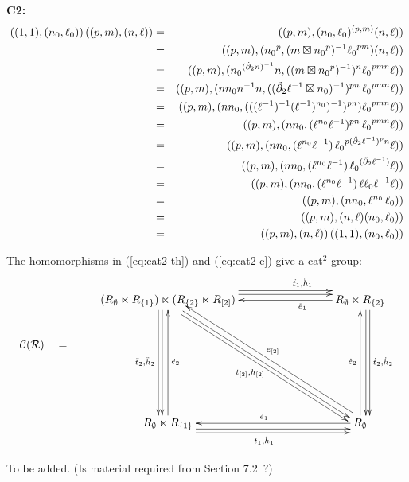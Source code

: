 \medskip\noindent
\textbf{C2:} 
\vspace{-4mm}
\begin{eqnarray*} 
((1,1),(n_0, \ell_0))\,((p,m), (n, \ell)) 
  & = & ((p, m),(n_0,\ell_0)^{(p,m)}(n,\ell))\\
  & = & ((p, m),({n_0}^p,(m \boxtimes {n_0}^p)^{-1} {\ell_0}^{pm}) (n,\ell))\\
  & = & ((p, m),({n_0}^{(\dot{\partial}_2 n)^{-1}} n,((m \boxtimes {n_0}^p)^{-1})^n
           {\ell_0}^{pmn} \ell))\\
  & = & ((p, m),(n n_0 n^{-1} n,((\ddot{\partial}_2\ell^{-1} \boxtimes n_0)^{-1})^{pn}\,
           {\ell_0}^{pmn} \ell))\\
  & = & ((p, m),(n n_0, (((\ell^{-1})^{-1}(\ell^{-1})^{n_0})^{-1})^{pn})
           {\ell_0}^{pmn} \ell))\\
  & = & ((p, m),(n n_0,(\ell^{n_0} \ell^{-1})^{pn}\,{\ell_0}^{pmn} \ell))\\
  & = & ((p, m),(n n_0,(\ell^{n_0} \ell^{-1})\,
           {\ell_0}^{p(\ddot{\partial}_2 \ell^{-1})^p n} \ell))\\
  & = & ((p, m),(n n_0,(\ell^{n_0} \ell^{-1})\,
           {\ell_0}^{(\ddot{\partial}_2 \ell^{-1})} \ell))\\
  & = & ((p, m),(n n_0,(\ell^{n_0} \ell^{-1})\,\ell {\ell_0} \ell^{-1} \ell))\\
  & = & ((p, m),(n n_0,\ell^{n_0}\,{\ell_0})) \\
  & = & ((p, m),(n, \ell)(n_0, \ell_0)) \\
  & = & ((p, m),(n, \ell))\,((1,1),(n_0, \ell_0))  
\end{eqnarray*}

\medskip
\begin{thm}
The homomorphisms in (\ref{eq:cat2-th}) and (\ref{eq:cat2-e}) 
give a cat$^2$-group:
\begin{equation} \label{eq:cat2-sdp}
\vcenter{\xymatrix{
 & (R_{\emptyset} \ltimes R_{\{1\}}) \ltimes (R_{\{2\}} \ltimes R_{[2]})
      \ar[ddd] <-1.2ex>  \ar[ddd] <-2.0ex>_{\ddttt,\ddhht}
      \ar[rrr] <+1.2ex>  \ar[rrr] <+2.0ex>^(0.7){\ddtto,\ddhho}
      \ar[dddrrr] <-0.2ex>  \ar[dddrrr] <-1.0ex>_{\ttot,\hhot}
    &&&  R_{\emptyset} \ltimes R_{\{2\}}
            \ar[lll]^(0.3){\ddeeo}
            \ar[ddd]<+1.2ex>  \ar[ddd] <+2.0ex>^{\dttt,\dhht}  \\
\calC(\calR) \quad = 
 &   &&&   \\
 &   &&&   \\
 & R_{\emptyset} \ltimes R_{\{1\}}
    \ar[uuu]_{\ddeet}
    \ar[rrr] <-1.2ex>  \ar[rrr] <-2.0ex>_{\dtto,\dhho} 
    &&&  R_{\emptyset} \ar[uuu]^{\deet}   \ar[lll]_{\deeo} 
           \ar[uuulll] <-1.0ex>_{\eeot}
 \\
}} 
\end{equation}
\end{thm}
\begin{pf}
To be added.  (Is material required from Section 7.2~?)
\end{pf}


